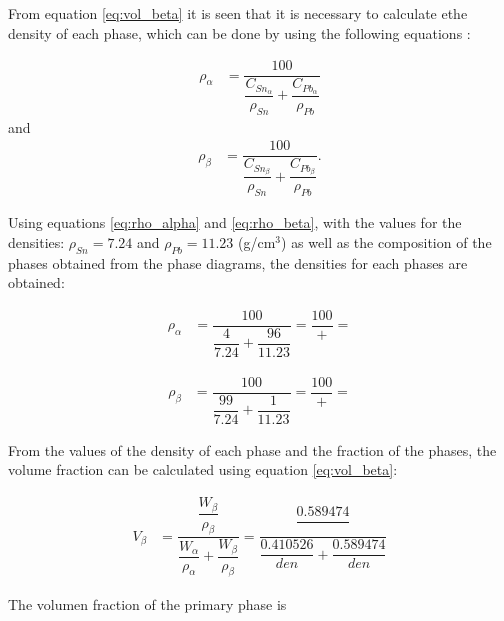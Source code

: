 From equation \eqref{eq:vol_beta} it is seen that it is necessary to calculate ethe density of each phase, which can be done by using the following equations \citet{callister2010materials}:

\begin{align}
    \label{eq:rho_alpha}
    \rho_{\alpha}&=\dfrac{100}{\dfrac{C_{Sn_{\alpha}}}{\rho_{Sn}}+\dfrac{C_{Pb_{\alpha}}}{\rho_{Pb}}}
\end{align}
and
\begin{align}
    \label{eq:rho_beta}
    \rho_{\beta}&=\dfrac{100}{\dfrac{C_{Sn_{\beta}}}{\rho_{Sn}}+\dfrac{C_{Pb_{\beta}}}{\rho_{Pb}}}.
\end{align}

Using equations \eqref{eq:rho_alpha} and \eqref{eq:rho_beta}, with the values for the densities: $\rho_{Sn}=7.24$ and $\rho_{Pb}=11.23$ (g/cm$^3$) \citet{callister2010materials} as well as the composition of the phases obtained from the phase diagrams, the densities for each phases are obtained:

\begin{align}
    \label{eq:rho_alpha_num}
    \rho_{\alpha}&=\dfrac{100}{\dfrac{4}{7.24}+\dfrac{96}{11.23}}=\dfrac{100}{+}=
\end{align}

\begin{align}
    \label{eq:rho_beta_num}
    \rho_{\beta}&=\dfrac{100}{\dfrac{99}{7.24}+\dfrac{1}{11.23}}=\dfrac{100}{+}=
\end{align}

From the values of the density of each phase and the fraction of the phases, the volume fraction can be calculated using equation \eqref{eq:vol_beta}:

\begin{align}
    \label{eq:vol_beta_num}
    V_{\beta}&=\dfrac{\dfrac{W_{\beta}}{\rho_{\beta}}}{\dfrac{W_{\alpha}}{\rho_{\alpha}}+\dfrac{W_{\beta}}{\rho_{\beta}}}=\dfrac{\dfrac{0.589474}{}}{\dfrac{0.410526}{den}+\dfrac{0.589474}{den}}
\end{align}


The volumen fraction of the primary phase is 

